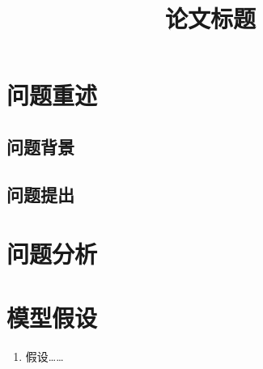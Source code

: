 \documentclass[withoutpreface,bwprint]{format}
\title{论文标题}
\begin{document}
\maketitle

\begin{abstract}
\label{abstract:end}
\end{abstract}

\label{body:start}
\section{问题重述}
\label{sec:restatement}

\subsection{问题背景}

\subsection{问题提出}

\section{问题分析}
\label{sec:analysis}

\section{模型假设}
\label{sec:assumptions}
\begin{enumerate}[label=\arabic*., leftmargin=2.5em, labelsep=0.6em]
  \item 假设……
\end{enumerate}
\end{document}
